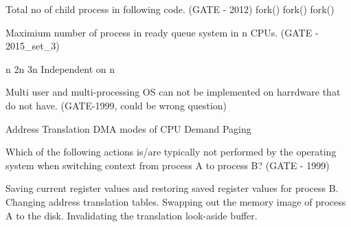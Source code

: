 
\begin{questyle}

  \question  Total no of child process in following code. (GATE - 2012) \newline
    fork()  \newline fork()  \newline  fork()

  \begin{oneparchoices}
  \end{oneparchoices}

\end{questyle}




\begin{questyle}

  \question Maximium number of process in ready queue system in n CPUs. (GATE - 2015\_set\_3)

  \begin{oneparchoices}
    \choice n
    \choice 2n
    \choice 3n
    \CorrectChoice Independent on n
  \end{oneparchoices}

\end{questyle}





\begin{questyle}

  \question  Multi user and multi-processing OS can not be implemented on harrdware that do not have. (GATE-1999, could be wrong question)

  \begin{oneparchoices}
    \choice Address Translation
    \choice DMA
     modes of CPU
    \choice Demand Paging
  \end{oneparchoices}

\end{questyle}




\begin{questyle}

  \question  Which of the following actions is/are typically not performed by the
              operating system when switching context from process A to process B? (GATE - 1999)

  \begin{choices}
    \choice Saving current register values and restoring saved register values for process B.
    \choice Changing address translation tables.
    \CorrectChoice Swapping out the memory image of process A to the disk.
    \choice Invalidating the translation look-aside buffer.
  \end{choices}

\end{questyle}



